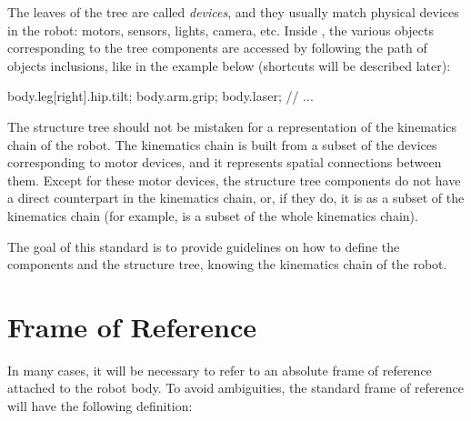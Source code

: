 The leaves of the tree are called \textit{devices}, and they usually
match physical devices in the robot: motors, sensors, lights, camera,
etc. Inside \urbi, the various objects corresponding to the tree
components are accessed by following the path of objects inclusions,
like in the example below (shortcuts will be described later):

\begin{urbiunchecked}
body.leg[right].hip.tilt;
body.arm.grip;
body.laser;
// ...
\end{urbiunchecked}


The structure tree should not be mistaken for a representation of the
kinematics chain of the robot. The kinematics chain is built from a
subset of the devices corresponding to motor devices, and it
represents spatial connections between them. Except for these motor
devices, the structure tree components do not have a direct
counterpart in the kinematics chain, or, if they do, it is as a subset
of the kinematics chain (for example,  is a subset of the
whole kinematics chain).


The goal of this standard is to provide guidelines on how to define
the components and the structure tree, knowing the kinematics chain of
the robot.

\section{Frame of Reference}

In many cases, it will be necessary to refer to an absolute frame of
reference attached to the robot body. To avoid ambiguities, the
standard frame of reference will have the following definition:

